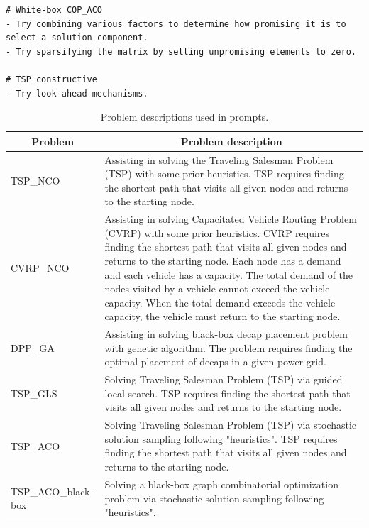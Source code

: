 \begin{lstlisting}[caption={Initial long-term reflections},  label={lst: initial long-term reflections}, style=promptstyle]
# White-box COP_ACO
- Try combining various factors to determine how promising it is to select a solution component.
- Try sparsifying the matrix by setting unpromising elements to zero.

# TSP_constructive
- Try look-ahead mechanisms.
\end{lstlisting}



\begin{table}[!thp]
    \small
    \centering
    \caption{Problem descriptions used in prompts.}
    \begin{tabular}{l|p{10cm}}
    \toprule
    \multicolumn{1}{c|}{Problem} & \multicolumn{1}{c}{Problem description} \\ \midrule
    TSP\_NCO &  Assisting in solving the Traveling Salesman Problem (TSP) with some prior heuristics. TSP requires finding the shortest path that visits all given nodes and returns to the starting node. \\ \midrule
    CVRP\_NCO & Assisting in solving Capacitated Vehicle Routing Problem (CVRP) with some prior heuristics. CVRP requires finding the shortest path that visits all given nodes and returns to the starting node. Each node has a demand and each vehicle has a capacity. The total demand of the nodes visited by a vehicle cannot exceed the vehicle capacity. When the total demand exceeds the vehicle capacity, the vehicle must return to the starting node. \\ \midrule
    DPP\_GA &  Assisting in solving black-box decap placement problem with genetic algorithm. The problem requires finding the optimal placement of decaps in a given power grid. \\ \midrule
    TSP\_GLS & Solving Traveling Salesman Problem (TSP) via guided local search. TSP requires finding the shortest path that visits all given nodes and returns to the starting node. \\
    \midrule
    TSP\_ACO & Solving Traveling Salesman Problem (TSP) via stochastic solution sampling following "heuristics". TSP requires finding the shortest path that visits all given nodes and returns to the starting node. \\ \midrule
    TSP\_ACO\_black-box & Solving a black-box graph combinatorial optimization problem via stochastic solution sampling following "heuristics". \\

\end{tabular}
\end{table}
